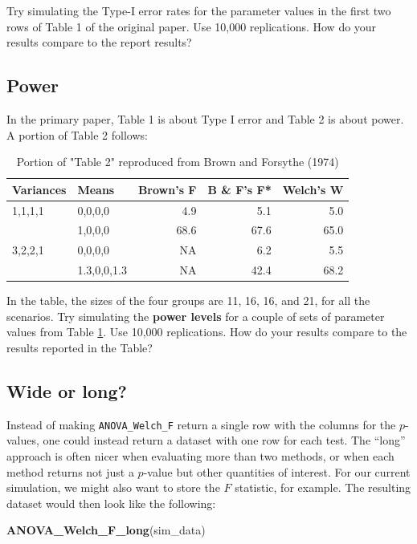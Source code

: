 \documentclass[
]{book}
\newenvironment{Shaded}{\begin{snugshade}}{\end{snugshade}}
\newcommand{\FunctionTok}[1]{\textcolor[rgb]{0.13,0.29,0.53}{\textbf{#1}}}
\newcommand{\NormalTok}[1]{#1}
\begin{document}
Try simulating the Type-I error rates for the parameter values in the first two rows of Table 1 of the original paper. Use 10,000 replications. How do your results compare to the report results?

\subsection{Power}\label{BF-power}

In the primary paper, Table 1 is about Type I error and Table 2 is about power. A portion of Table 2 follows:

\begin{table}

\caption{\label{tab:BF-power}Portion of "Table 2" reproduced from Brown and Forsythe (1974)}
\centering
\begin{tabular}[t]{l|l|r|r|r}
\hline
Variances & Means & Brown's F & B \& F's F* & Welch's W\\
\hline
1,1,1,1 & 0,0,0,0 & 4.9 & 5.1 & 5.0\\
\hline
 & 1,0,0,0 & 68.6 & 67.6 & 65.0\\
\hline
3,2,2,1 & 0,0,0,0 & NA & 6.2 & 5.5\\
\hline
 & 1.3,0,0,1.3 & NA & 42.4 & 68.2\\
\hline
\end{tabular}
\end{table}

In the table, the sizes of the four groups are 11, 16, 16, and 21, for all the scenarios.
Try simulating the \textbf{power levels} for a couple of sets of parameter values from Table \ref{tab:BF-power}.
Use 10,000 replications.
How do your results compare to the results reported in the Table?

\subsection{Wide or long?}\label{BF-wide-long}

Instead of making \texttt{ANOVA\_Welch\_F} return a single row with the columns for the \(p\)-values, one could instead return a dataset with one row for each test. The ``long'' approach is often nicer when evaluating more than two methods, or when each method returns not just a \(p\)-value but other quantities of interest. For our current simulation, we might also want to store the \(F\) statistic, for example. The resulting dataset would then look like the following:

\begin{Shaded}
\begin{Highlighting}[]
\FunctionTok{ANOVA\_Welch\_F\_long}\NormalTok{(sim\_data)}
\end{Highlighting}
\end{Shaded}
\end{document}
